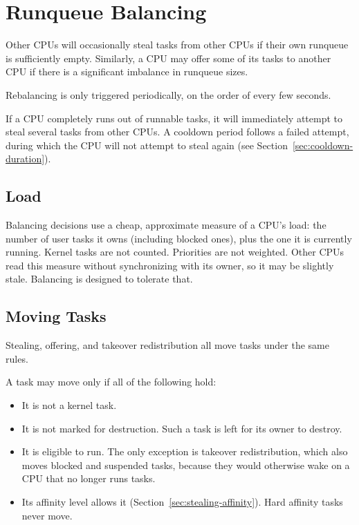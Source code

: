 \documentclass[11pt]{article}
\begin{document}
\section{Runqueue Balancing}
\label{sec:balancing}

Other CPUs will occasionally steal tasks from other CPUs if their own runqueue is sufficiently empty.
Similarly, a CPU may offer some of its tasks to another CPU if there is a significant imbalance in runqueue sizes.

Rebalancing is only triggered periodically, on the order of every few seconds.

If a CPU completely runs out of runnable tasks, it will immediately attempt to steal several tasks from other CPUs.
A cooldown period follows a failed attempt, during which the CPU will not attempt to steal again (see Section~\ref{sec:cooldown-duration}).

\subsection{Load}

Balancing decisions use a cheap, approximate measure of a CPU's load: the number of user tasks it owns (including blocked ones), plus the one it is currently running.
Kernel tasks are not counted. Priorities are not weighted.
Other CPUs read this measure without synchronizing with its owner, so it may be slightly stale. Balancing is designed to tolerate that.

\subsection{Moving Tasks}
\label{sec:moving-tasks}

Stealing, offering, and takeover redistribution all move tasks under the same rules.

A task may move only if all of the following hold:

\begin{itemize}
	\item It is not a kernel task.
	\item It is not marked for destruction. Such a task is left for its owner to destroy.
	\item It is eligible to run. The only exception is takeover redistribution, which also moves blocked and suspended tasks, because they would otherwise wake on a CPU that no longer runs tasks.
	\item Its affinity level allows it (Section~\ref{sec:stealing-affinity}). Hard affinity tasks never move.
\end{itemize}
\end{document}
